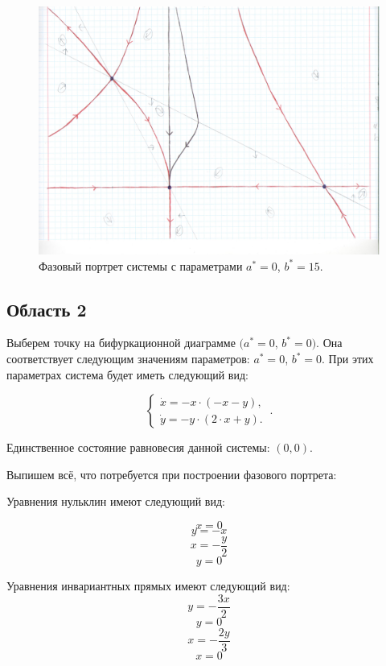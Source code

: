 \begin{figure}[h]
	\includegraphics[width=\textwidth]{phptr/(0,15).jpg}
	\centering
	\caption{\label{fig:phportr01} Фазовый портрет системы с параметрами $a^\ast = 0$, $b^\ast = 15$.}
\end{figure}



\subsection{Область 2}

Выберем точку на бифуркационной диаграмме $(a^\ast = 0$, $b^\ast = 0)$. Она соответствует следующим значениям параметров:  $a^\ast = 0$, $b^\ast = 0$. При этих параметрах система будет иметь следующий вид: 

$$
\left \lbrace 
\begin{matrix} 
	\dot{x} = -x \cdot (-x - y), \\
	\dot{y} = -y \cdot (2 \cdot x + y). \
\end{matrix} 
\right . .$$

Единственное состояние равновесия данной системы: $(0, 0)$.

Выпишем всё, что потребуется при построении фазового портрета:

Уравнения нульклин имеют следующий вид: 

$$x=0$$
$$y=- x$$
$$x=- \frac{y}{2}$$
$$y=0$$


Уравнения инвариантных прямых имеют следующий вид: 
$$y = - \frac{3 x}{2}$$
$$y = 0$$
$$x = - \frac{2 y}{3}$$
$$x = 0$$



